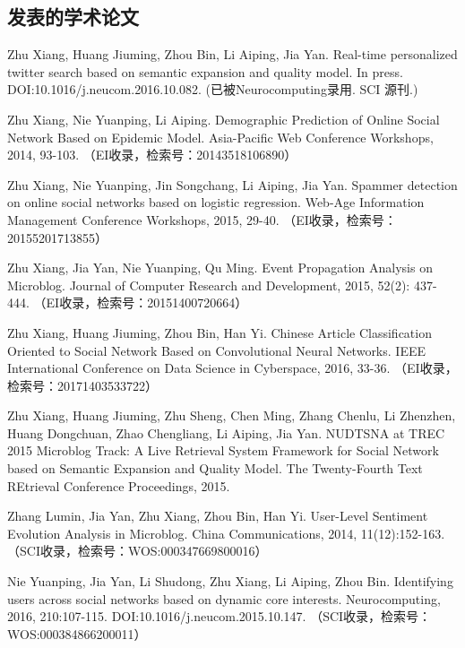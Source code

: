 \begin{resume}

  \section*{发表的学术论文} %

  \begin{enumerate}[{[}1{]}]
  \addtolength{\itemsep}{-.36\baselineskip}%
  \item Zhu Xiang, Huang Jiuming, Zhou Bin, Li Aiping, Jia Yan. Real-time personalized twitter search based on semantic expansion and quality model. In press. DOI:10.1016/j.neucom.2016.10.082. (已被Neurocomputing录用. SCI 源刊.)
  \item Zhu Xiang, Nie Yuanping, Li Aiping. Demographic Prediction of Online Social Network Based on Epidemic Model. Asia-Pacific Web Conference Workshops, 2014, 93-103. （EI收录，检索号：20143518106890）
  \item Zhu Xiang, Nie Yuanping, Jin Songchang, Li Aiping, Jia Yan. Spammer detection on online social networks based on logistic regression. Web-Age Information Management Conference Workshops, 2015, 29-40. （EI收录，检索号：20155201713855）
  \item Zhu Xiang, Jia Yan, Nie Yuanping, Qu Ming. Event Propagation Analysis on Microblog. Journal of Computer Research and Development, 2015, 52(2): 437-444. （EI收录，检索号：20151400720664）
  \item Zhu Xiang, Huang Jiuming, Zhou Bin, Han Yi. Chinese Article Classification Oriented to Social Network Based on Convolutional Neural Networks. IEEE International Conference on Data Science in Cyberspace, 2016, 33-36. （EI收录，检索号：20171403533722）
  \item Zhu Xiang, Huang Jiuming, Zhu Sheng, Chen Ming, Zhang Chenlu, Li Zhenzhen, Huang Dongchuan, Zhao Chengliang, Li Aiping, Jia Yan. NUDTSNA at TREC 2015 Microblog Track: A Live Retrieval System Framework for Social Network based on Semantic Expansion and Quality Model. The Twenty-Fourth Text REtrieval Conference Proceedings, 2015.
  \item Zhang Lumin, Jia Yan, Zhu Xiang, Zhou Bin, Han Yi.  User-Level Sentiment Evolution Analysis in Microblog. China Communications, 2014, 11(12):152-163. （SCI收录，检索号：WOS:000347669800016）
  \item Nie Yuanping, Jia Yan, Li Shudong, Zhu Xiang, Li Aiping, Zhou Bin.  Identifying users across social networks based on dynamic core interests. Neurocomputing, 2016, 210:107-115. DOI:10.1016/j.neucom.2015.10.147. （SCI收录，检索号：WOS:000384866200011）

\end{enumerate}
\end{resume}
